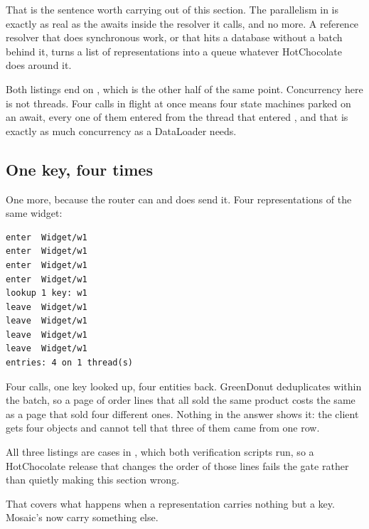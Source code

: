 That is the sentence worth carrying out of this section. The parallelism in
 is exactly as real as the awaits inside the resolver it
calls, and no more. A reference resolver that does synchronous work, or that
hits a database without a batch behind it, turns a list of representations into
a queue whatever HotChocolate does around it.

Both listings end on , which is the other half of the
same point. Concurrency here is not threads. Four calls in flight at once means
four state machines parked on an await, every one of them entered from the
thread that entered , and that is exactly as much concurrency
as a DataLoader needs.

\subsection*{One key, four times}

%
One more, because the router can and does send it. Four representations of the
same widget:

\begin{verbatim}
enter  Widget/w1
enter  Widget/w1
enter  Widget/w1
enter  Widget/w1
lookup 1 key: w1
leave  Widget/w1
leave  Widget/w1
leave  Widget/w1
leave  Widget/w1
entries: 4 on 1 thread(s)
\end{verbatim}

Four calls, one key looked up, four entities back. GreenDonut deduplicates
within the batch, so a page of order lines that all sold the same product costs
the same as a page that sold four different ones. Nothing in the answer shows
it: the client gets four objects and cannot tell that three of them came from
one row.

All three listings are cases in , which both
verification scripts run, so a HotChocolate release that changes the order of
those lines fails the gate rather than quietly making this section wrong.

\medskip
That covers what happens when a representation carries nothing but a key.
Mosaic's now carry something else.

%
